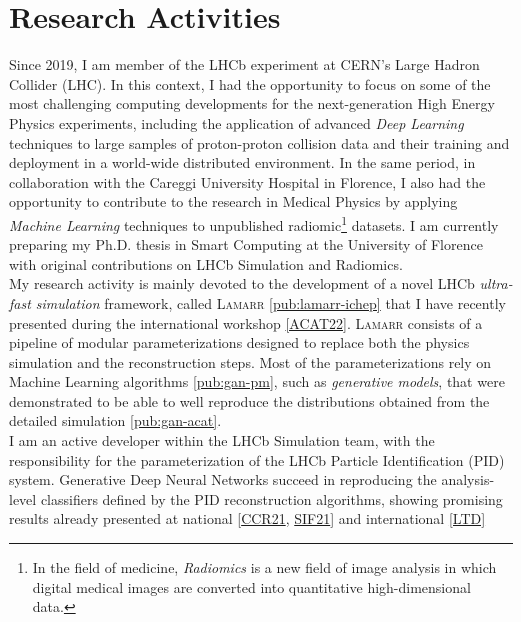 \section*{Research Activities}
\begin{cvcontent}
  Since 2019, I am member of the LHCb experiment at CERN's Large 
  Hadron Collider (LHC). In this context, I had the opportunity to 
  focus on some of the most challenging computing developments for 
  the next-generation High Energy Physics experiments, including the 
  application of advanced \emph{Deep Learning} techniques to large 
  samples of proton-proton collision data and their training and 
  deployment in a world-wide distributed environment.
  In the same period, in collaboration with the Careggi University 
  Hospital in Florence, 
  I also had the opportunity to contribute to the research in Medical 
  Physics by applying \emph{Machine Learning} techniques to unpublished 
  radiomic\footnote{In the field of medicine, \emph{Radiomics} is a new 
  field of image analysis in which digital medical images are converted 
  into quantitative high-dimensional data.} datasets.
  I am currently preparing my Ph.D. thesis in Smart Computing at 
  the University of Florence with original contributions on 
  LHCb Simulation and Radiomics.
  \\ [1.5mm]
  My research activity is mainly devoted to the development of a novel 
  LHCb \emph{ultra-fast simulation} framework, called \textsc{Lamarr}
  \ref{pub:lamarr-ichep} that I have recently presented during the 
  international workshop \hyperlink{acat-2022}{[ACAT22]}. \textsc{Lamarr} 
  consists of a pipeline of modular parameterizations designed to replace 
  both the physics simulation and the reconstruction steps. Most of the 
  parameterizations rely on Machine Learning algorithms \ref{pub:gan-pm},
  such as \emph{generative models}, that were demonstrated to be 
  able to well reproduce the distributions obtained from the 
  detailed simulation \ref{pub:gan-acat}.
  \\ [1.5mm]
  I am an active developer within the LHCb Simulation team, with
  the responsibility for the parameterization of the LHCb Particle 
  Identification (PID) system. Generative Deep Neural Networks
  succeed in reproducing the analysis-level classifiers defined 
  by the PID reconstruction algorithms, showing promising results
  already presented at national [\hyperlink{ccr-2021}{CCR21}, 
  \hyperlink{sif-2021}{SIF21}] and international \hyperlink{ltd}{[LTD]} 

\end{cvcontent}
